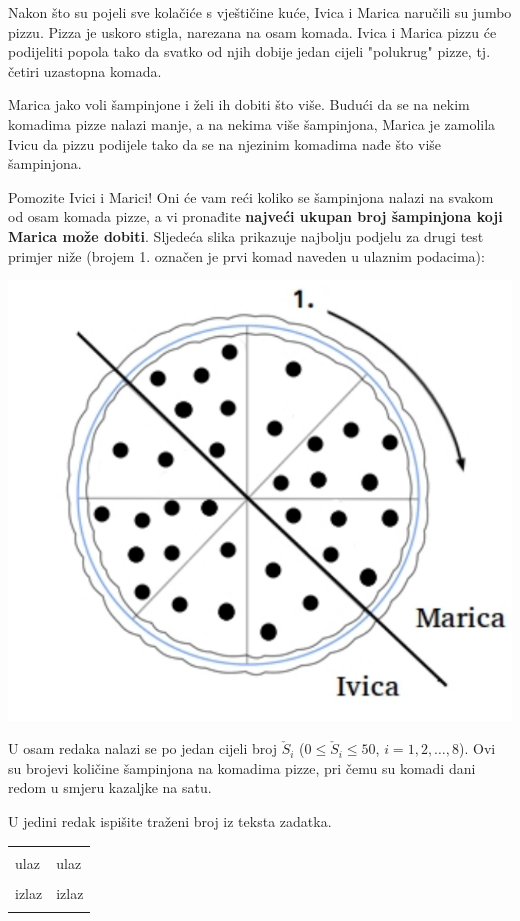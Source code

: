 \renewcommand{\taskname}{FUNGHI}
\renewcommand{\timelimit}{1 sekunda}
\renewcommand{\memorylimit}{32 MB}
\renewcommand{\score}{50 bodova}

Nakon što su pojeli sve kolačiće s vještičine kuće, Ivica i Marica naručili su jumbo pizzu. Pizza je uskoro stigla, narezana na osam komada. Ivica i Marica pizzu će podijeliti popola tako da svatko od njih dobije jedan cijeli "polukrug" pizze, tj. četiri uzastopna komada.

Marica jako voli šampinjone i želi ih dobiti što više. Budući da se na nekim komadima pizze nalazi manje, a na nekima više šampinjona, Marica je zamolila Ivicu da pizzu podijele tako da se na njezinim komadima nađe što više šampinjona.

Pomozite Ivici i Marici! Oni će vam reći koliko se šampinjona nalazi na svakom od osam komada pizze, a vi pronađite \textbf{najveći ukupan broj šampinjona koji Marica može dobiti}. Sljedeća slika prikazuje najbolju podjelu za drugi test primjer niže (brojem 1. označen je prvi komad naveden u ulaznim podacima):

\begin{center}
\includegraphics[width=.4\linewidth]{funghi/slika.pdf}
\end{center}

\strut


U osam redaka nalazi se po jedan cijeli broj $\check{S}_i$ ($0 \leqslant \check{S}_i \leqslant 50$, $i = 1, 2, \ldots, 8$).
Ovi su brojevi količine šampinjona na komadima pizze, pri čemu su komadi dani redom u smjeru kazaljke na satu.

\strut


U jedini redak ispišite traženi broj iz teksta zadatka.

\strut


\begin{center}
\fontfamily{\ttdefault}
\fontsize{10pt}{1em}
\selectfont
\begin{tabu}to 0.99\textwidth{|X[1]|X[1]|}
\hline
& \\ 
\rowfont{\fontsize{10pt}{1em}\bfseries}
ulaz & ulaz \\
 & 
 \\
\rowfont{\fontsize{10pt}{1em}\bfseries}
izlaz & izlaz \\
 & 
 \\
\hline
\end{tabu}
\end{center}

{
\fontsize{10pt}{1em}
\selectfont
}